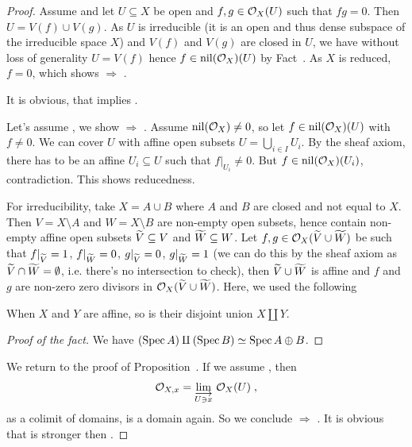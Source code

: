 \documentclass[a4paper,parskip=half,numbers=enddot, DIV=12]{scrreprt}
\begin{document}
\begin{proof}
    Assume  and let $U\subseteq X$ be open and $f,g\in \mathcal{O}_X(U)$ such that $fg = 0$. Then $U = V(f)\cup V(g)$. As $U$ is irreducible (it is an open and thus dense subspace of the irreducible space $X$) and $V(f)$ and $V(g)$ are closed in $U$, we have without loss of generality $U = V(f)$ hence $f\in\operatorname{nil}(\mathcal{O}_X)(U)$ by Fact~. As $X$ is reduced, $f=0$, which shows  $\Rightarrow$ .
    
    It is obvious, that  implies .
    
    Let's assume , we show  $\Rightarrow$ . Assume $\operatorname{nil}(\mathcal{O}_X) \neq 0$, so let $f\in \operatorname{nil}(\mathcal{O}_X)(U)$ with $f\neq 0$. We can cover $U$ with affine open subsets $U=\bigcup_{i\in I}U_i$. By the sheaf axiom, there has to be an affine $U_i \subseteq U$ such that $f|_{U_i} \neq 0$. But $f\in \operatorname{nil}(\mathcal{O}_X)(U_i)$, contradiction. This shows reducedness. 
    
    For irreducibility, take $X=A\cup B$ where $A$ and $B$ are closed and not equal to $X$. Then $V=X\setminus A$ and $W= X\setminus B$ are non-empty open subsets, hence contain non-empty affine open subsets $\snake V \subseteq V$ and $\snake W \subseteq W$. Let $f,g\in \Oo_X(\snake V\cup\snake W)$ be such that $f|_{\snake V} = 1$, $f|_{\snake W} = 0$, $g|_{\snake V} = 0$, $g|_{\snake W} = 1$ (we can do this by the sheaf axiom as $\snake V\cap\snake W=\emptyset$, i.e. there's no intersection to check), then $\snake V\cup \snake W$ is affine and $f$ and $g$ are non-zero zero divisors in $\Oo_X(\snake V\cup \snake W)$. Here, we used the following 
    \begin{fact*}
    	When $X$ and $Y$ are affine, so is their disjoint union $X\amalg Y$.
    \end{fact*}
    \begin{proof}[Proof of the fact] 
    	We have $(\operatorname{Spec} A) \amalg (\operatorname{Spec} B) \simeq \operatorname{Spec} A\oplus B$.
    \end{proof}
    
    We return to the proof of Proposition~. If we assume , then 
    \begin{align*}
        \Oo_{X,x} = \colimit[U\ni x] \Oo_X(U)\;,
    \end{align*}
    as a colimit of domains, is a domain again. So we conclude  $\Rightarrow$ . It is obvious that  is stronger then .
    

\end{proof}
\end{document}
